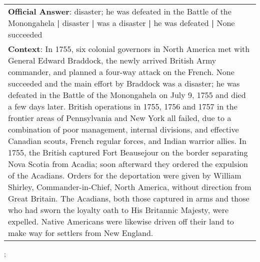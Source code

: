 \begin{figure*}[ht]
{\begin{tabular}{p{}}
            \textbf{Official Answer}: disaster; he was defeated in the Battle of the Monongahela \textbf{|} disaster \textbf{|} was a disaster \textbf{|} he was defeated \textbf{|} None succeeded                                                                                                                                                                                                                                                                                                                                                                                                                                                                                                                                                                                                                                                                                                                                                                                                                                                                                                                                                 \\
            \textbf{Context}: In 1755, six colonial governors in North America met with General Edward Braddock, the newly arrived British Army commander, and planned a four-way attack on the French. None succeeded and the main effort by Braddock was a disaster; he was defeated in the Battle of the Monongahela on July 9, 1755 and died a few days later. British operations in 1755, 1756 and 1757 in the frontier areas of Pennsylvania and New York all failed, due to a combination of poor management, internal divisions, and effective Canadian scouts, French regular forces, and Indian warrior allies. In 1755, the British captured Fort Beausejour on the border separating Nova Scotia from Acadia; soon afterward they ordered the expulsion of the Acadians. Orders for the deportation were given by William Shirley, Commander-in-Chief, North America, without direction from Great Britain. The Acadians, both those captured in arms and those who had sworn the loyalty oath to His Britannic Majesty, were expelled. Native Americans were likewise driven off their land to make way for settlers from New England. \\
        \end{tabular}
    };
    \label{fig:ex-5733d13e4776f419006612c5}
\end{figure*}


